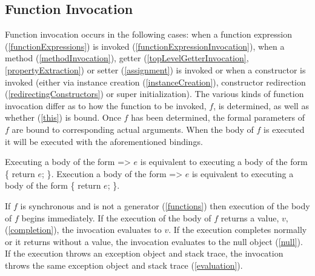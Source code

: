 \documentclass{article}
\newcommand{\code}[1]{{\sf #1}}
\begin{document}



\subsection{ Function Invocation}

\LMHash{}
Function invocation occurs in the following cases: when a function expression  (\ref{functionExpressions}) is invoked (\ref{functionExpressionInvocation}), when a method (\ref{methodInvocation}), getter (\ref{topLevelGetterInvocation}, \ref{propertyExtraction}) or setter (\ref{assignment}) is invoked or when a constructor is invoked (either via instance creation (\ref{instanceCreation}), constructor redirection (\ref{redirectingConstructors}) or super initialization). The various kinds of function invocation differ as to how the function to be invoked, $f$,  is determined, as well as whether \THIS{} (\ref{this}) is bound. Once $f$ has been determined, the formal parameters of $f$ are bound to corresponding actual arguments. When the body of $f$ is executed it will be executed with the aforementioned bindings.

\LMHash{}
Executing a body of the form \code{=> $e$} is equivalent to executing a body of the form \code{\{ return $e$; \}}.
Execution a body of the form \code{\ASYNC{} => $e$} is equivalent to executing a body of the form \code{\ASYNC{} \{ return $e$; \}}.

\LMHash{}
If $f$ is synchronous and is not a generator (\ref{functions}) then execution of the body of $f$ begins immediately.
If the execution of the body of $f$ returns a value, $v$, (\ref{completion}), the invocation evaluates to $v$.
If the execution completes normally or it returns without a value, the invocation evaluates to the null object (\ref{null}).
If the execution throws an exception object and stack trace, the invocation throws the same exception object and stack trace (\ref{evaluation}).

\end{document}
